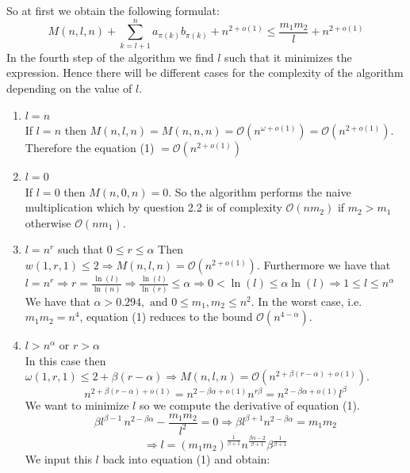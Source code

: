\documentclass[10pt,a4paper]{article}
\begin{document}
\begin{enumerate}
So at first we obtain the following formulat:
\begin{equation}\label{comp}
M(n,l,n) + \sum _{k=l+1}^n a_{\pi(k)}b_{\pi(k)} + n^{2+o(1)} \leq \frac{m_1m_2}{l} + n^{2+o(1)}
\end{equation}
In the fourth step of the algorithm we find $l$ such that it minimizes the expression. Hence there will be different cases for the complexity of the algorithm depending on the value of $l$.
\begin{enumerate}
\item $l = n$\\
If $l = n$ then $M(n,l,n) = M(n,n,n) = \mathcal{O}(n^{\omega + o(1)}) = \mathcal{O}(n^{2 + o(1)})$. Therefore the equation (1) $= \mathcal{O}(n^{2+o(1)})$\\
\item $l = 0$\\
If $l=0$ then  $M(n,0,n)= 0$. So the algorithm performs the naive multiplication which by question 2.2 is of complexity $\mathcal{O}(nm_2)$ if $m_2 > m_1$ otherwise $\mathcal{O}(nm_1)$.\\
\item $l = n^r$ such that $0 \leq r \leq \alpha$
Then $w(1,r,1) \leq 2 \Rightarrow M(n,l,n) = \mathcal{O}(n^{2+o(1)})$. Furthermore we have that $l = n^r \Rightarrow r = \frac{\ln(l)}{\ln(n)} \Rightarrow \frac{\ln(l)}{\ln(r)} \leq \alpha \Rightarrow 0< \ln(l)\leq \alpha \ln(l) \Rightarrow1 \leq  l \leq n^\alpha $\\
We have that $\alpha > 0.294, \text{ and }0\leq m_1,m_2 \leq n^2$. In the worst case, i.e. $m_1m_2 = n^4$, equation (1) reduces to the bound $\mathcal{O}(n^{4 - \alpha})$.\\
\item $l > n^\alpha$ or $r > \alpha$\\
In this case then $\omega(1,r,1) \leq 2 + \beta(r-\alpha) \Rightarrow M(n,l,n) = \mathcal{O}(n^{2+\beta(r-\alpha) + o(1)})$.   
$$n^{2+\beta(r-\alpha) + o(1)} = n^{2-\beta\alpha + o(1)}n^{r\beta} = n^{2-\beta\alpha + o(1)}l^\beta$$
We want to minimize $l$ so we compute the derivative of equation (1).
$$\beta l^{\beta - 1} \,n^{2-\beta\alpha }  - \frac{m_1m_2}{l^2}= 0 \Rightarrow \beta l^{\beta+1} n^{2-\beta\alpha} = m_1m_2 $$ $$\Rightarrow l = (m_1m_2)^{\frac{1}{\beta+1}} n ^ {\frac{\beta\alpha - 2 }{\beta + 1}} \beta ^{\frac{1}{\beta + 1}}$$
We input this $l$ back into equation (1) and obtain:


\end{enumerate}
\end{enumerate}
\end{document}
